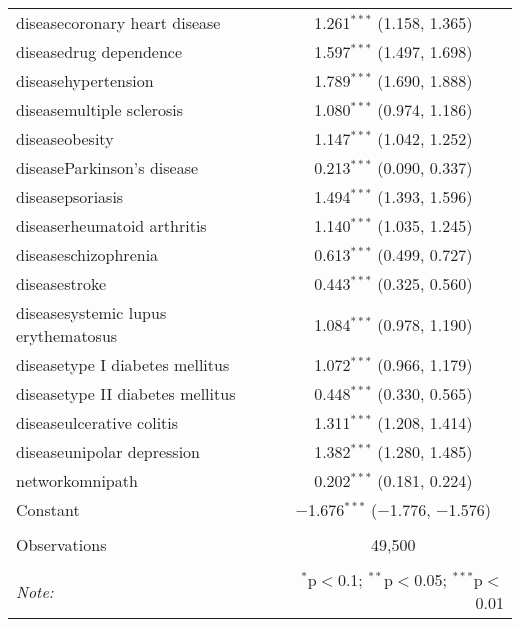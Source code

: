 \begin{table}[!htbp]
\begin{tabular}{@{\extracolsep{5pt}}lc}
  diseasecoronary heart disease & 1.261$^{***}$ (1.158, 1.365) \\ 
  diseasedrug dependence & 1.597$^{***}$ (1.497, 1.698) \\ 
  diseasehypertension & 1.789$^{***}$ (1.690, 1.888) \\ 
  diseasemultiple sclerosis & 1.080$^{***}$ (0.974, 1.186) \\ 
  diseaseobesity & 1.147$^{***}$ (1.042, 1.252) \\ 
  diseaseParkinson's disease & 0.213$^{***}$ (0.090, 0.337) \\ 
  diseasepsoriasis & 1.494$^{***}$ (1.393, 1.596) \\ 
  diseaserheumatoid arthritis & 1.140$^{***}$ (1.035, 1.245) \\ 
  diseaseschizophrenia & 0.613$^{***}$ (0.499, 0.727) \\ 
  diseasestroke & 0.443$^{***}$ (0.325, 0.560) \\ 
  diseasesystemic lupus erythematosus & 1.084$^{***}$ (0.978, 1.190) \\ 
  diseasetype I diabetes mellitus & 1.072$^{***}$ (0.966, 1.179) \\ 
  diseasetype II diabetes mellitus & 0.448$^{***}$ (0.330, 0.565) \\ 
  diseaseulcerative colitis & 1.311$^{***}$ (1.208, 1.414) \\ 
  diseaseunipolar depression & 1.382$^{***}$ (1.280, 1.485) \\ 
  networkomnipath & 0.202$^{***}$ (0.181, 0.224) \\ 
  Constant & $-$1.676$^{***}$ ($-$1.776, $-$1.576) \\ 
 \hline \\[-1.8ex] 
Observations & 49,500 \\ 
\hline 
\hline \\[-1.8ex] 
\textit{Note:}  & \multicolumn{1}{r}{$^{*}$p$<$0.1; $^{**}$p$<$0.05; $^{***}$p$<$0.01} \\ 
\end{tabular} 
\end{table} 
